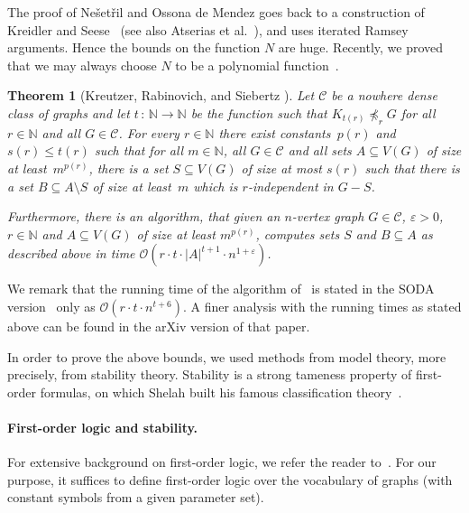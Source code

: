 \documentclass[11pt, fleqn]{article}
\theoremstyle{plain}
\newtheorem{theorem}{Theorem}
\theoremstyle{nonumberplain}
\newcommand{\Oof}{\mathcal{O}}
\newcommand{\CCC}{\mathcal{C}}
\newcommand{\N}{\mathbb{N}}
\renewcommand{\epsilon}{\varepsilon}
\newcommand{\minor}{\preccurlyeq}
\begin{document}
The proof of Ne\v{s}et\v{r}il and Ossona de Mendez goes back to a construction
of Kreidler and Seese~\cite{kreidler1998monadic} (see also Atserias et al.~\cite{atserias2006preservation}), 
and uses iterated
Ramsey arguments. Hence the bounds on the function $N$ are huge. Recently, 
we proved that we may always choose $N$ to be a polynomial 
function~\cite{siebertz2016polynomial}. 

\begin{theorem}[Kreutzer, Rabinovich, and Siebertz \cite{siebertz2016polynomial}]\label{thm:uqw}
  Let $\CCC$ be a nowhere dense class of graphs and let 
  $t\,\colon\,\N\rightarrow \N$ be the function such that
  $K_{t(r)}\not\minor_r G$ for all $r\in \N$ and all $G\in \CCC$.  
  For every $r\in \N$
  there exist constants~$p(r)$ and $s(r)\leq t(r)$ such that
  for all $m\in \N$, all $G\in\CCC$ and all sets $A\subseteq V(G)$ of size at 
  least~$m^{p(r)}$, there is a set $S\subseteq V(G)$ of size at
  most $s(r)$ such that there is a set $B\subseteq A\setminus S$ of size at
  least~$m$ which is $r$-independent in $G-S$.
  
  Furthermore, there is an algorithm, that given an $n$-vertex graph
  $G\in \CCC$, $\epsilon>0$, $r\in \N$ and $A\subseteq V(G)$ of size at least
  $m^{p(r)}$, computes sets $S$ and $B\subseteq A$ as described above
  in
  time $\Oof(r\cdot t\cdot |A|^{t+1}\cdot n^{1+\epsilon})$.
\end{theorem}

We remark that the running time of the algorithm of~
is stated in the SODA version~\cite{siebertz2016polynomial} only as 
$\Oof(r\cdot t\cdot n^{t+6})$. A finer analysis with the running
times as stated above can be found in the arXiv version of that paper.

In order to prove the above bounds, we used methods from model
theory, more precisely, from stability theory. Stability is a strong tameness
property of first-order formulas, on which Shelah built his famous 
classification theory~\cite{shelah1990classification}.


\paragraph{First-order logic and stability.}
For extensive background on first-order logic, we refer the reader
to~\cite{hodges1993model}. For our purpose, it suffices to define
first-order logic over the vocabulary of graphs (with constant symbols
from a given parameter set).
 
\end{document}
